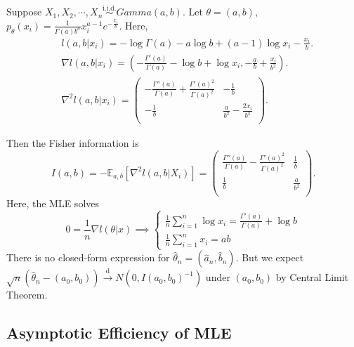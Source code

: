 \documentclass[a4paper]{article}
\begin{document}
\begin{eg}
	Suppose $X_1,X_2,\cdots,X_n \stackrel{\text{i.i.d.}}{\sim} Gamma(a,b)$. Let $\theta=(a,b)$, $p_{\theta}(x_i) = \frac{1}{\Gamma(a)b^a}x_i^{a-1}e^{-\frac{x_i}{b}}$. Here,
	\begin{equation*}
		\begin{aligned}
			& l(a,b|x_i) = -\log \Gamma(a) - a \log b + (a-1)\log x_i - \frac{x_i}{b}. \\
			& \nabla l(a,b|x_i) = \left(-\frac{\Gamma'(a)}{\Gamma(a)}-\log b + \log x_i, -\frac{a}{b}+\frac{x_i}{b^2}\right). \\
			& \nabla^2 l(a,b|x_i) = \begin{pmatrix}
				-\frac{\Gamma''(a)}{\Gamma(a)} + \frac{\Gamma'(a)^2}{\Gamma(a)^2} & -\frac{1}{b} \\
				-\frac{1}{b} & \frac{a}{b^2}-\frac{2x_i}{b^3} \\
			\end{pmatrix}.
		\end{aligned}
	\end{equation*}
\end{eg}
Then the Fisher information is
\begin{equation*}
	I(a,b) = -\mathbb{E}_{a,b}[\nabla^2 l(a,b|X_i)] = \begin{pmatrix}
		\frac{\Gamma''(a)}{\Gamma(a)} - \frac{\Gamma'(a)^2}{\Gamma(a)^2} & \frac{1}{b} \\
		\frac{1}{b} & \frac{a}{b^2} \\
	\end{pmatrix}.
\end{equation*}
Here, the MLE solves
\begin{equation*}
	0 = \frac{1}{n}\nabla l(\theta|x) \implies \left\{\begin{array}{l}
		\frac{1}{n} \sum\limits_{i=1}^n \log x_i = \frac{\Gamma'(a)}{\Gamma(a)} + \log b \\
		\frac{1}{n} \sum\limits_{i=1}^n x_i = ab
	\end{array} \right.
\end{equation*}
There is no closed-form expression for $\hat{\theta}_n = (\hat{a}_n,\hat{b}_n)$. But we expect $\sqrt{n}(\hat{\theta}_n - (a_0,b_0)) \stackrel{\text{d}}{\longrightarrow} N(0,I(a_0,b_0)^{-1})$ under $(a_0,b_0)$ by Central Limit Theorem.

\subsection{Asymptotic Efficiency of MLE}
\end{document}
